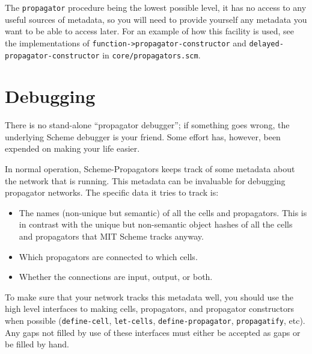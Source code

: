 \documentclass[12pt,letterpaper,english]{article}
\begin{document}
The \texttt{propagator} procedure being the lowest possible level, it has
no access to any useful sources of metadata, so you will need to
provide yourself any metadata you want to be able to access later.
For an example of how this facility is used, see the implementations
of \texttt{function->propagator-constructor} and
\texttt{delayed-propagator-constructor} in \texttt{core/propagators.scm}.



\hypertarget{debugging}{}
\section{Debugging}
\label{debugging}

There is no stand-alone ``propagator debugger''; if something goes
wrong, the underlying Scheme debugger is your friend.  Some effort
has, however, been expended on making your life easier.

In normal operation, Scheme-Propagators keeps track of some metadata
about the network that is running.  This metadata can be invaluable
for debugging propagator networks.  The specific data it tries to
track is:
\begin{itemize}
\item {} 
The names (non-unique but semantic) of all the cells and
propagators.  This is in contrast with the unique but non-semantic
object hashes of all the cells and propagators that MIT Scheme
tracks anyway.

\item {} 
Which propagators are connected to which cells.

\item {} 
Whether the connections are input, output, or both.

\end{itemize}

To make sure that your network tracks this metadata well, you should
use the high level interfaces to making cells, propagators, and
propagator constructors when possible (\texttt{define-cell}, \texttt{let-cells},
\texttt{define-propagator}, \texttt{propagatify}, etc).  Any gaps not
filled by use of these interfaces must either be accepted as gaps or
be filled by hand.
\end{document}
